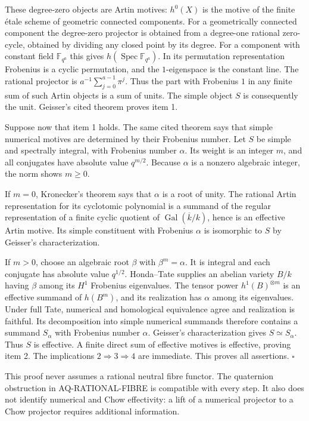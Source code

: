 \documentclass[11pt,a4paper]{article}
\theoremstyle{definition}\newtheorem{definition}[theorem]{Definition}
\theoremstyle{remark}\newtheorem{remark}[theorem]{Remark}
\begin{document}
These degree-zero objects are Artin motives: $h^0(X)$ is the
motive of the finite \'etale scheme of geometric connected
components.  For a geometrically connected component the
degree-zero projector is obtained from a degree-one rational
zero-cycle, obtained by dividing any closed point by its degree.
For a component with constant field $\mathbb F_{q^a}$ this gives
$h(\operatorname{Spec}\mathbb F_{q^a})$.  In its permutation
representation Frobenius is a cyclic permutation, and the
$1$-eigenspace is the constant line.  The rational projector is
$a^{-1}\sum_{j=0}^{a-1}\pi^j$.  Thus the part with Frobenius $1$
in any finite sum of such Artin objects is a sum of units.  The
simple object $S$ is consequently the unit.  Geisser's cited
theorem proves item 1.

Suppose now that item 1 holds.  The same cited theorem says that
simple numerical motives are determined by their Frobenius number.
Let $S$ be simple and spectrally integral, with Frobenius number
$\alpha$.  Its weight is an integer $m$, and all conjugates have
absolute value $q^{m/2}$.  Because $\alpha$ is a nonzero algebraic
integer, the norm shows $m\geq0$.

If $m=0$, Kronecker's theorem says that $\alpha$ is a root of
unity.  The rational Artin representation for its cyclotomic
polynomial is a summand of the regular representation of a finite
cyclic quotient of $\operatorname{Gal}(\overline k/k)$, hence is
an effective Artin motive.  Its simple constituent with Frobenius
$\alpha$ is isomorphic to $S$ by Geisser's characterization.

If $m>0$, choose an algebraic root $\beta$ with $\beta^m=\alpha$.
It is integral and each conjugate has absolute value $q^{1/2}$.
Honda--Tate supplies an abelian variety $B/k$ having $\beta$ among
its $H^1$ Frobenius eigenvalues.  The tensor power
$h^1(B)^{\otimes m}$ is an effective summand of $h(B^m)$, and its
realization has $\alpha$ among its eigenvalues.  Under full Tate,
numerical and homological equivalence agree and realization is
faithful.  Its decomposition into simple numerical summands
therefore contains a summand $S_\alpha$ with Frobenius number
$\alpha$.  Geisser's characterization gives $S\simeq S_\alpha$.
Thus $S$ is effective.  A finite direct sum of effective motives
is effective, proving item 2.  The implications $2\Rightarrow3
\Rightarrow4$ are immediate.  This proves all assertions.
\(\square\)

This proof never assumes a rational neutral fibre functor.
The quaternion obstruction in AQ-RATIONAL-FIBRE is compatible
with every step.  It also does not identify numerical and Chow
effectivity: a lift of a numerical projector to a Chow projector
requires additional information.
\end{document}
